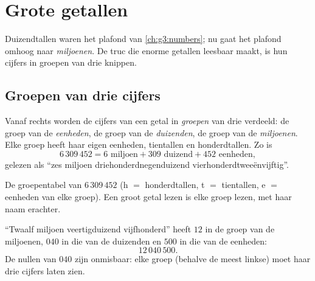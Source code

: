 \chapter{Grote getallen}\label{ch:g4:numbers}

Duizendtallen waren het plafond van \cref{ch:g3:numbers}; nu gaat het
plafond omhoog naar \emph{miljoenen}. De truc die enorme getallen
leesbaar maakt, is hun cijfers in groepen van drie knippen.

\section{Groepen van drie cijfers}

\begin{definition}\label{def:g4:numbers:classes}
Vanaf rechts worden de cijfers van een getal in \emph{groepen} van drie
verdeeld: de groep van de \emph{eenheden}, de groep van de
\emph{duizenden}, de groep van de \emph{miljoenen}. Elke groep heeft haar
eigen eenheden, tientallen en honderdtallen. Zo is
\[
6\,309\,452 = 6 \text{ miljoen} + 309 \text{ duizend}
+ 452 \text{ eenheden},
\]
gelezen als ``zes miljoen driehonderdnegenduizend
vierhonderdtweeënvijftig''.
\end{definition}

\begin{omfigure}

{\small De groepentabel van $6\,309\,452$ (h $=$ honderdtallen, t $=$
tientallen, e $=$ eenheden van elke groep). Een groot getal lezen is elke
groep lezen, met haar naam erachter.}
\end{omfigure}

\begin{example}\label{ex:g4:numbers:write}
``Twaalf miljoen veertigduizend vijfhonderd'' heeft $12$ in de groep van
de miljoenen, $040$ in die van de duizenden en $500$ in die van de
eenheden:
\[
12\,040\,500 .
\]
De nullen van $040$ zijn onmisbaar: elke groep (behalve de meest linkse)
moet haar drie cijfers laten zien.
\end{example}

